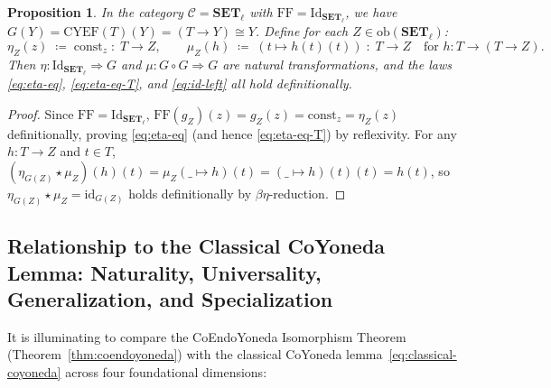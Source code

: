 \documentclass[11pt,a4paper]{article}
\newtheorem{proposition}[theorem]{Proposition}
\theoremstyle{definition}
\theoremstyle{remark}
\newcommand{\Set}{\mathbf{SET}}
\newcommand{\Id}{\mathrm{Id}}
\newcommand{\id}{\mathrm{id}}
\newcommand{\CYEF}{\mathrm{CYEF}}
\newcommand{\FF}{\mathrm{FF}}
\newcommand{\const}{\mathrm{const}}
\begin{document}
\begin{proposition}\label{prop:set-fc}
In the category $\mathcal{C} = \Set_\ell$ with $\FF = \Id_{\Set_\ell}$, we have
$G(Y) = \CYEF(T)(Y) = (T \to Y) \cong Y$. Define for each $Z \in \mathrm{ob}(\Set_\ell)$:
\[
  \eta_Z(z) \;\coloneqq\; \const_z \;:\; T \to Z,
  \qquad
  \mu_Z(h) \;\coloneqq\; (t \mapsto h(t)(t)) \;:\; T \to Z
  \quad\text{for } h : T \to (T \to Z).
\]
Then $\eta : \Id_{\Set_\ell} \Rightarrow G$ and $\mu : G \circ G \Rightarrow G$ are natural
transformations, and the laws \eqref{eq:eta-eq}, \eqref{eq:eta-eq-T}, and \eqref{eq:id-left} all hold
definitionally.
\end{proposition}

\begin{proof}
Since $\FF = \Id_{\Set_\ell}$, $\FF(g_Z)(z) = g_Z(z) = \const_z = \eta_Z(z)$ definitionally, proving
\eqref{eq:eta-eq} (and hence \eqref{eq:eta-eq-T}) by reflexivity. For any $h : T \to Z$ and $t \in T$,
$(\eta_{G(Z)} \star \mu_Z)(h)(t) = \mu_Z(\_ \mapsto h)(t) = (\_ \mapsto h)(t)(t) = h(t)$, so
$\eta_{G(Z)} \star \mu_Z = \id_{G(Z)}$ holds definitionally by $\beta\eta$-reduction.
\end{proof}

\subsection{Relationship to the Classical CoYoneda Lemma: Naturality, Universality, Generalization, and Specialization}\label{subsec:coyoneda-comparison}

It is illuminating to compare the CoEndoYoneda Isomorphism Theorem (Theorem~\ref{thm:coendoyoneda})
with the classical CoYoneda lemma~\eqref{eq:classical-coyoneda} across four foundational dimensions:
\end{document}
